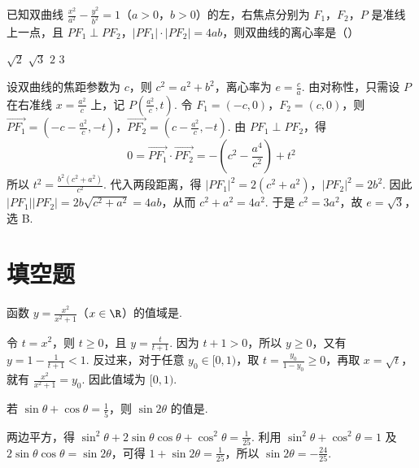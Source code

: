 \begin{problem}
已知双曲线 \(\frac{x^2}{a^2} - \frac{y^2}{b^2} = 1\)（\(a>0\)，\(b>0\)）的左，右焦点分别为 \(F_1\)，\(F_2\)，\(P\) 是准线上一点，且 \(PF_1 \perp PF_2\)，\(\left|PF_1\right| \cdot \left|PF_2\right| = 4ab\)，则双曲线的离心率是（\quad）

\choices
    {\(\sqrt{2}\)}
    {\(\sqrt{3}\)}
    {\(2\)}
    {\(3\)}
\end{problem}

\begin{solution}
设双曲线的焦距参数为 \(c\)，则 \(c^2=a^2+b^2\)，离心率为 \(e=\frac{c}{a}\). 由对称性，只需设 \(P\) 在右准线 \(x=\frac{a^2}{c}\) 上，记 \(P\left(\frac{a^2}{c},t\right)\). 令 \(F_1=(-c,0)\)，\(F_2=(c,0)\)，则
\(\overrightarrow{PF_1}=\left(-c-\frac{a^2}{c},-t\right)\)，\(\overrightarrow{PF_2}=\left(c-\frac{a^2}{c},-t\right)\).
由 \(PF_1\perp PF_2\)，得
\[
0=\overrightarrow{PF_1}\cdot\overrightarrow{PF_2}=-\left(c^2-\frac{a^4}{c^2}\right)+t^2
\]
所以 \(t^2=\frac{b^2(c^2+a^2)}{c^2}\). 代入两段距离，得
\(\left|PF_1\right|^2=2(c^2+a^2)\)，\(\left|PF_2\right|^2=2b^2\).
因此 \(\left|PF_1\right|\left|PF_2\right|=2b\sqrt{c^2+a^2}=4ab\)，从而 \(c^2+a^2=4a^2\). 于是 \(c^2=3a^2\)，故 \(e=\sqrt{3}\)，选 B.
\end{solution}

\section{填空题}

\begin{problem}
函数 \(y=\frac{x^2}{x^2+1}\)（\(x\in\R\)）的值域是\fillinblank{}.
\end{problem}
\answer{\([0,1)\)}

\begin{solution}
令 \(t=x^2\)，则 \(t\geqslant0\)，且 \(y=\frac{t}{t+1}\). 因为 \(t+1>0\)，所以 \(y\geqslant0\)，又有 \(y=1-\frac{1}{t+1}<1\). 反过来，对于任意 \(y_0\in[0,1)\)，取 \(t=\frac{y_0}{1-y_0}\geqslant0\)，再取 \(x=\sqrt{t}\)，就有 \(\frac{x^2}{x^2+1}=y_0\). 因此值域为 \([0,1)\).
\end{solution}

\begin{problem}
若 \(\sin \theta + \cos \theta = \frac{1}{5}\)，则 \(\sin 2\theta\) 的值是\fillinblank{}.
\end{problem}

\begin{solution}
两边平方，得 \(\sin^2\theta+2\sin\theta\cos\theta+\cos^2\theta=\frac{1}{25}\). 利用 \(\sin^2\theta+\cos^2\theta=1\) 及 \(2\sin\theta\cos\theta=\sin2\theta\)，可得 \(1+\sin2\theta=\frac{1}{25}\)，所以 \(\sin2\theta=-\frac{24}{25}\).
\end{solution}

